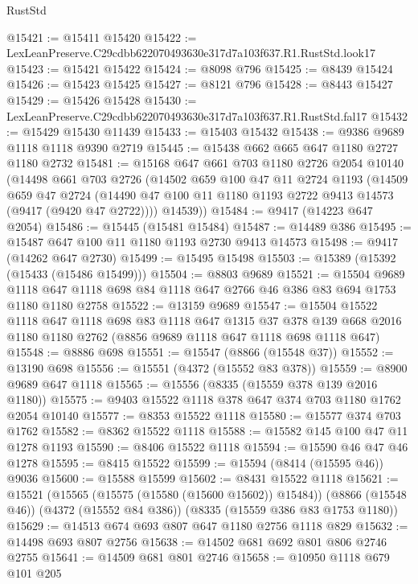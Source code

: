\begin{lexlean}{RustStd}
\begin{coremodule}
@15421 := @15411 @15420
@15422 := LexLeanPreserve.C29cdbb622070493630e317d7a103f637.R1.RustStd.look17
@15423 := @15421 @15422
@15424 := @8098 @796
@15425 := @8439 @15424
@15426 := @15423 @15425
@15427 := @8121 @796
@15428 := @8443 @15427
@15429 := @15426 @15428
@15430 := LexLeanPreserve.C29cdbb622070493630e317d7a103f637.R1.RustStd.fal17
@15432 := @15429 @15430 @11439
@15433 := @15403 @15432
@15438 := @9386 @9689 @1118 @1118 @9390 @2719
@15445 := @15438 @662 @665 @647 @1180 @2727 @1180 @2732
@15481 := @15168
    @647
    @661
    @703
    @1180
    @2726
    @2054
    @10140
    (@14498
      @661
      @703
      @2726
      (@14502
        @659
        @100
        @47
        @11
        @2724
        @1193
        (@14509
          @659
          @47
          @2724
          (@14490 @47 @100 @11 @1180 @1193 @2722 @9413 @14573 (@9417 (@9420 @47 @2722))))
        @14539))
@15484 := @9417 (@14223 @647 @2054)
@15486 := @15445 (@15481 @15484)
@15487 := @14489 @386
@15495 := @15487 @647 @100 @11 @1180 @1193 @2730 @9413 @14573
@15498 := @9417 (@14262 @647 @2730)
@15499 := @15495 @15498
@15503 := @15389 (@15392 (@15433 (@15486 @15499)))
@15504 := @8803 @9689
@15521 := @15504
    @9689
    @1118
    @647
    @1118
    @698
    @84
    @1118
    @647
    @2766
    @46
    @386
    @83
    @694
    @1753
    @1180
    @1180
    @2758
@15522 := @13159 @9689
@15547 := @15504
    @15522
    @1118
    @647
    @1118
    @698
    @83
    @1118
    @647
    @1315
    @37
    @378
    @139
    @668
    @2016
    @1180
    @1180
    @2762
    (@8856 @9689 @1118 @647 @1118 @698 @1118 @647)
@15548 := @8886 @698
@15551 := @15547 (@8866 (@15548 @37))
@15552 := @13190 @698
@15556 := @15551 (@4372 (@15552 @83 @378))
@15559 := @8900 @9689 @647 @1118
@15565 := @15556 (@8335 (@15559 @378 @139 @2016 @1180))
@15575 := @9403 @15522 @1118 @378 @647 @374 @703 @1180 @1762 @2054 @10140
@15577 := @8353 @15522 @1118
@15580 := @15577 @374 @703 @1762
@15582 := @8362 @15522 @1118
@15588 := @15582 @145 @100 @47 @11 @1278 @1193
@15590 := @8406 @15522 @1118
@15594 := @15590 @46 @47 @46 @1278
@15595 := @8415 @15522
@15599 := @15594 (@8414 (@15595 @46)) @9036
@15600 := @15588 @15599
@15602 := @8431 @15522 @1118
@15621 := @15521
    (@15565 (@15575 (@15580 (@15600 @15602)) @15484))
    (@8866 (@15548 @46))
    (@4372 (@15552 @84 @386))
    (@8335 (@15559 @386 @83 @1753 @1180))
@15629 := @14513 @674 @693 @807 @647 @1180 @2756 @1118 @829
@15632 := @14498 @693 @807 @2756
@15638 := @14502 @681 @692 @801 @806 @2746 @2755
@15641 := @14509 @681 @801 @2746
@15658 := @10950
    @1118
    @679
    @101
    @205

\end{coremodule}
\end{lexlean}
